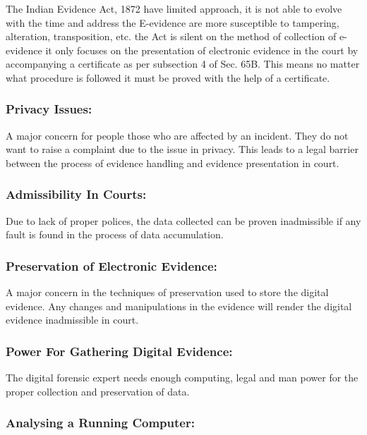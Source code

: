 \documentclass[british]{article}
\begin{document}
The Indian Evidence Act, 1872 have limited approach, it is not able
to evolve with the time and address the E-evidence are more susceptible
to tampering, alteration, transposition, etc. the Act is silent on
the method of collection of e-evidence it only focuses on the presentation
of electronic evidence in the court by accompanying a certificate
as per subsection 4 of Sec. 65B. This means no matter what procedure
is followed it must be proved with the help of a certificate.

\subsubsection{Privacy Issues:}

A major concern for people those who are affected by an incident.
They do not want to raise a complaint due to the issue in privacy.
This leads to a legal barrier between the process of evidence handling
and evidence presentation in court.

\subsubsection{Admissibility In Courts:}

Due to lack of proper polices, the data collected can be proven inadmissible
if any fault is found in the process of data accumulation. 

\subsubsection{Preservation of Electronic Evidence:}

A major concern in the techniques of preservation used to store the
digital evidence. Any changes and manipulations in the evidence will
render the digital evidence inadmissible in court.

\subsubsection{Power For Gathering Digital Evidence:}

The digital forensic expert needs enough computing, legal and man
power for the proper collection and preservation of data.

\subsubsection{Analysing a Running Computer:}
\end{document}
